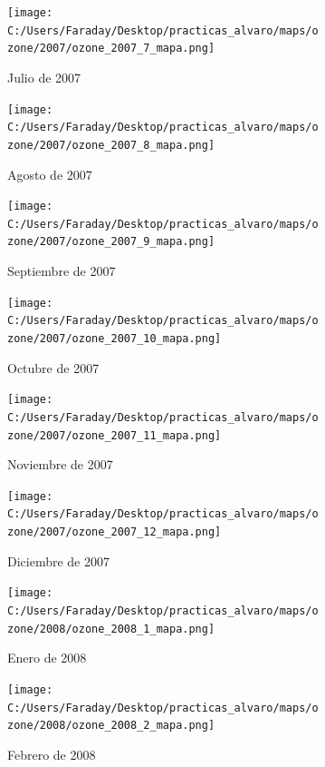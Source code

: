 \documentclass[12pt]{article}
\begin{document}
\newpage

\begin{figure}[H]
\centering
\begin{subfigure}[h]{0.45\textwidth}
\texttt{[image: C:/Users/Faraday/Desktop/practicas\_alvaro/maps/ozone/2007/ozone\_2007\_7\_mapa.png]}
\caption{Julio de 2007}
\label{fig:map-mon-2-7-2007}
\end{subfigure}
%
\begin{subfigure}[H]{0.45\textwidth}
\texttt{[image: C:/Users/Faraday/Desktop/practicas\_alvaro/maps/ozone/2007/ozone\_2007\_8\_mapa.png]}
\caption{Agosto de 2007}
\label{fig:map-mon-2-8-2007}
\end{subfigure}
\caption{}
\end{figure}

\begin{figure}[H]
\centering
\begin{subfigure}[h]{0.45\textwidth}
\texttt{[image: C:/Users/Faraday/Desktop/practicas\_alvaro/maps/ozone/2007/ozone\_2007\_9\_mapa.png]}
\caption{Septiembre de 2007}
\label{fig:map-mon-2-9-2007}
\end{subfigure}
%
\begin{subfigure}[H]{0.45\textwidth}
\texttt{[image: C:/Users/Faraday/Desktop/practicas\_alvaro/maps/ozone/2007/ozone\_2007\_10\_mapa.png]}
\caption{Octubre de 2007}
\label{fig:map-mon-2-10-2007}
\end{subfigure}
\caption{}
\end{figure}

\begin{figure}[H]
\centering
\begin{subfigure}[h]{0.45\textwidth}
\texttt{[image: C:/Users/Faraday/Desktop/practicas\_alvaro/maps/ozone/2007/ozone\_2007\_11\_mapa.png]}
\caption{Noviembre de 2007}
\label{fig:map-mon-2-11-2007}
\end{subfigure}
%
\begin{subfigure}[H]{0.45\textwidth}
\texttt{[image: C:/Users/Faraday/Desktop/practicas\_alvaro/maps/ozone/2007/ozone\_2007\_12\_mapa.png]}
\caption{Diciembre de 2007}
\label{fig:map-mon-2-12-2007}
\end{subfigure}
\caption{}
\end{figure}

\newpage

\begin{figure}[H]
\centering
\begin{subfigure}[h]{0.45\textwidth}
\texttt{[image: C:/Users/Faraday/Desktop/practicas\_alvaro/maps/ozone/2008/ozone\_2008\_1\_mapa.png]}
\caption{Enero de 2008}
\label{fig:map-mon-2-1-2008}
\end{subfigure}
%
\begin{subfigure}[H]{0.45\textwidth}
\texttt{[image: C:/Users/Faraday/Desktop/practicas\_alvaro/maps/ozone/2008/ozone\_2008\_2\_mapa.png]}
\caption{Febrero de 2008}
\label{fig:map-mon-2-2-2008}
\end{subfigure}
\caption{}
\end{figure}
\end{document}
